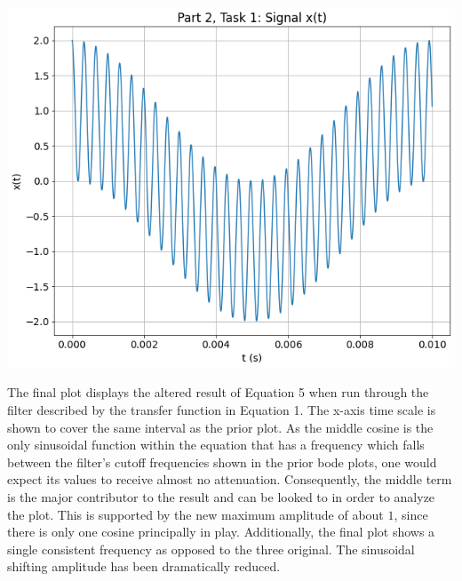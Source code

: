 \documentclass[12pt]{report}
\begin{document}
\begin{center}
	\includegraphics[scale = 0.4]{Lab 10 - Plots/Part2-Task1.png}\\[0.4 cm]
\end{center}

The final plot displays the altered result of Equation 5 when run through the filter described by the transfer function in Equation 1. The x-axis time scale is shown to cover the same interval as the prior plot. As the middle cosine is the only sinusoidal function within the equation that has a frequency which falls between the filter's cutoff frequencies shown in the prior bode plots, one would expect its values to receive almost no attenuation. Consequently, the middle term is the major contributor to the result and can be looked to in order to analyze the plot. This is supported by the new maximum amplitude of about $ 1 $, since there is only one cosine principally in play. Additionally, the final plot shows a single consistent frequency as opposed to the three original. The sinusoidal shifting amplitude has been dramatically reduced. \\
\end{document}
